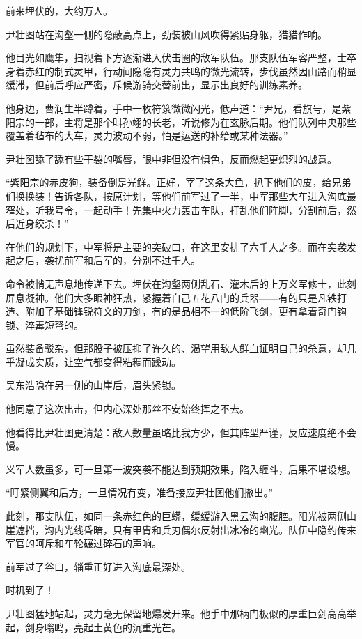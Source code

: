 前来埋伏的，大约万人。

尹壮图站在沟壑一侧的隐蔽高点上，劲装被山风吹得紧贴身躯，猎猎作响。

他目光如鹰隼，扫视着下方逐渐进入伏击圈的敌军队伍。那支队伍军容严整，士卒身着赤红的制式灵甲，行动间隐隐有灵力共鸣的微光流转，步伐虽然因山路而稍显缓滞，但前后呼应严密，斥候游骑交替前出，显示出良好的训练素养。

他身边，曹润生半蹲着，手中一枚符箓微微闪光，低声道：“尹兄，看旗号，是紫阳宗的一部，主将是那个叫孙翊的长老，听说修为在玄脉后期。他们队列中央那些覆盖着毡布的大车，灵力波动不弱，怕是运送的补给或某种法器。”

尹壮图舔了舔有些干裂的嘴唇，眼中非但没有惧色，反而燃起更炽烈的战意。

“紫阳宗的赤皮狗，装备倒是光鲜。正好，宰了这条大鱼，扒下他们的皮，给兄弟们换换装！告诉各队，按原计划，等他们前军过了一半，中军那些大车进入沟底最窄处，听我号令，一起动手！先集中火力轰击车队，打乱他们阵脚，分割前后，然后近身绞杀！”

在他们的规划下，中军将是主要的突破口，在这里安排了六千人之多。而在突袭发起之后，袭扰前军和后军的，分别不过千人。

命令被悄无声息地传递下去。埋伏在沟壑两侧乱石、灌木后的上万义军修士，此刻屏息凝神。他们大多眼神狂热，紧握着自己五花八门的兵器——有的只是凡铁打造、附加了基础锋锐符文的刀剑，有的是品相不一的低阶飞剑，更有拿着奇门钩锁、淬毒短弩的。

虽然装备驳杂，但那股子被压抑了许久的、渴望用敌人鲜血证明自己的杀意，却几乎凝成实质，让空气都变得粘稠而躁动。

吴东浩隐在另一侧的山崖后，眉头紧锁。

他同意了这次出击，但内心深处那丝不安始终挥之不去。

他看得比尹壮图更清楚：敌人数量虽略比我方少，但其阵型严谨，反应速度绝不会慢。

义军人数虽多，可一旦第一波突袭不能达到预期效果，陷入缠斗，后果不堪设想。

“盯紧侧翼和后方，一旦情况有变，准备接应尹壮图他们撤出。”

此刻，那支队伍，如同一条赤红色的巨蟒，缓缓游入黑云沟的腹腔。阳光被两侧山崖遮挡，沟内光线昏暗，只有甲胄和兵刃偶尔反射出冰冷的幽光。队伍中隐约传来军官的呵斥和车轮碾过碎石的声响。

前军过了谷口，辎重正好进入沟底最深处。

时机到了！

尹壮图猛地站起，灵力毫无保留地爆发开来。他手中那柄门板似的厚重巨剑高高举起，剑身嗡鸣，亮起土黄色的沉重光芒。

